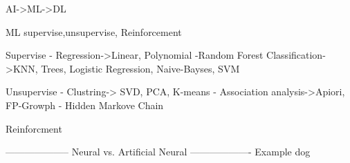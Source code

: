 \documentclass{article}
\begin{document}
AI->ML->DL

ML supervise,unsupervise, Reinforcement

Supervise
- Regression->Linear, Polynomial
-Random Forest
Classification->KNN, Trees, Logistic Regression, Naive-Bayses, SVM

Unsupervise
- Clustring-> SVD, PCA, K-means
- Association analysis->Apiori, FP-Growph
- Hidden Markove Chain

Reinforcment


--------------------
Neural vs. Artificial Neural
-------------------
Example dog
\end{document}
